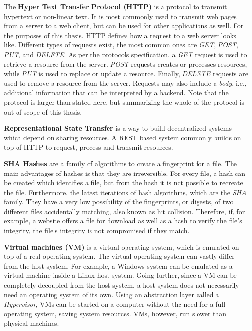 The \textbf{Hyper Text Transfer Protocol (HTTP)}\cite{http-rfc} is a protocol to transmit hypertext or non-linear text.
It is most commonly used to transmit web pages from a server to a web client, but can be used for other applications as well.
For the purposes of this thesis, HTTP defines how a request to a web server looks like.
Different types of requests exist, the most common ones are \textit{GET}, \textit{POST}, \textit{PUT}, and \textit{DELETE}.
As per the protocols specification, a \textit{GET} request is used to retrieve a resource from the server.
\textit{POST} requests creates or processes resources, while \textit{PUT} is used to replace or update a resource.
Finally, \textit{DELETE} requests are used to remove a resource from the server.
Requests may also include a \textit{body}, i.e., additional information that can be interpreted by a backend.
Note that the protocol is larger than stated here, but summarizing the whole of the protocol is out of scope of this thesis.

\textbf{Representational State Transfer}\cite{extending-representation-state-transfer} is a way to build decentralized systems which depend on sharing resources.
A REST based system commonly builds on top of HTTP to request, process and transmit resources.

\textbf{SHA Hashes}\cite{cryptographic-hash-functions,sha-hashes} are a family of algorithms to create a fingerprint for a file.
The main advantages of hashes is that they are irreversible.
For every file, a hash can be created which identifies a file, but from the hash it is not possible to recreate the file.
Furthermore, the latest iterations of hash algorithms, which are the \textit{SHA} family.
They have a very low possibility of the fingerprints, or digests, of two different files accidentally matching, also known as hit collision.
Therefore, if, for example, a website offers a file for download as well as a hash to verify the file's integrity, the file's integrity is not compromised if they match.

\textbf{Virtual machines (VM)}\cite{what-is-a-virtual-machine} is a virtual operating system, which is emulated on top of a real operating system.
The virtual operating system can vastly differ from the host system.
For example, a Windows system can be emulated as a virtual machine inside a Linux host system.
Going further, since a VM can be completely decoupled from the host system, a host system does not necessarily need an operating system of its own.
Using an abstraction layer called a \textit{Hypervisor}, VMs can be started on a computer without the need for a full operating system, saving system resources.
VMs, however, run slower than physical machines.


